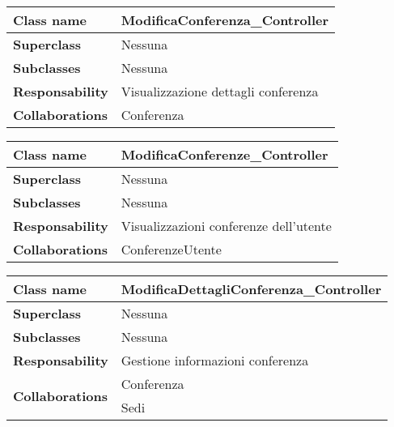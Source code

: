 \begin{table}[h!]
	\begin{tabular}{|l|l|}
		\hline 
		\textbf{Class name} & ModificaConferenza\_Controller
		\\ \hline
		\textbf{Superclass} & Nessuna
		\\ \hline
		\multirow{1}{*}{\textbf{Subclasses}} & Nessuna
		\\ \hline
		\textbf{Responsability} & Visualizzazione dettagli conferenza
		\\ \hline
		\multirow{1}{*}{\textbf{Collaborations}} & Conferenza
		\\ \hline
	\end{tabular}
\end{table}
\newpage
\begin{table}[h!]
	\begin{tabular}{|l|l|}
		\hline 
		\textbf{Class name} & ModificaConferenze\_Controller
		\\ \hline
		\textbf{Superclass} & Nessuna
		\\ \hline
		\multirow{1}{*}{\textbf{Subclasses}} & Nessuna
		\\ \hline
		\textbf{Responsability} & Visualizzazioni conferenze dell'utente
		\\ \hline
		\multirow{1}{*}{\textbf{Collaborations}} & ConferenzeUtente
		\\ \hline
	\end{tabular}
\end{table}
\begin{table}[h!]
	\begin{tabular}{|l|l|}
		\hline 
		\textbf{Class name} & ModificaDettagliConferenza\_Controller
		\\ \hline
		\textbf{Superclass} & Nessuna
		\\ \hline
		\multirow{1}{*}{\textbf{Subclasses}} & Nessuna
		\\ \hline
		\textbf{Responsability} & Gestione informazioni conferenza
		\\ \hline
		\multirow{2}{*}{\textbf{Collaborations}} & Conferenza \\
		& Sedi 
		\\ \hline
	\end{tabular}
\end{table}

